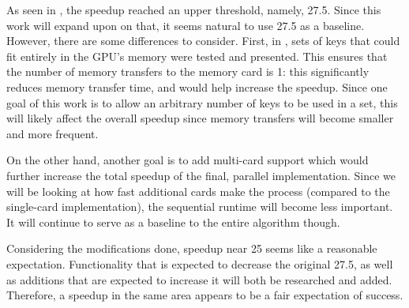 \documentclass[12pt]{ucthesis}
\begin{document}
As seen in \cite{scharfglass2012breaking}, the speedup reached an upper threshold,
namely, 27.5. Since this work will expand upon on that, it seems natural to use
27.5 as a baseline. However, there are some differences to consider. First,
in \cite{scharfglass2012breaking}, sets of keys that could fit entirely in the
GPU's memory were tested and presented. This ensures that the number of memory
transfers to the memory card is 1: this significantly reduces memory transfer
time, and would help increase the speedup. Since one goal of this work is to
allow an arbitrary number of keys to be used in a set, this will likely affect
the overall speedup since memory transfers will become smaller and more
frequent.

On the other hand, another goal is to add multi-card support which would
further increase the total speedup of the final, parallel implementation. Since
we will be looking at how fast additional cards make the process (compared to
the single-card implementation), the sequential runtime will become less
important. It will continue to serve as a baseline to the entire algorithm
though. 

Considering the modifications done, speedup near 25 seems like a reasonable
expectation. Functionality that is expected to decrease the original 27.5, as
well as additions that are expected to increase it will both be researched and
added. Therefore, a speedup in the same area appears to be a fair expectation
of success.


\clearpage


\end{document}

